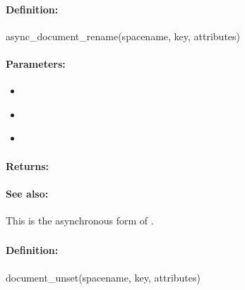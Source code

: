 \paragraph{Definition:}
\begin{rubycode}
async_document_rename(spacename, key, attributes)
\end{rubycode}

\paragraph{Parameters:}
\begin{itemize}[noitemsep]
\item {}\\

\item {}\\

\item {}\\

\end{itemize}

\paragraph{Returns:}


\paragraph{See also:}  This is the asynchronous form of .

\pagebreak
\subsubsection{}
\label{api:ruby:document_unset}


\paragraph{Definition:}
\begin{rubycode}
document_unset(spacename, key, attributes)
\end{rubycode}

